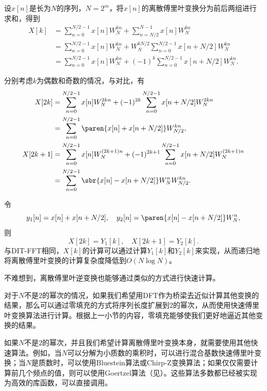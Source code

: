 设$x[n]$是长为$N$的序列，$N=2^m$，将$x[n]$的离散傅里叶变换分为前后两组进行求和，得到
\begin{align}
    X[k]&=\sum_{n=0}^{N/2-1}x[n]W_N^{kn}+\sum_{n=N/2}^{N-1}x[n]W_N^{kn} \nonumber \\
    &=\sum_{n=0}^{N/2-1}x[n]W_N^{kn}+W_N^{kN/2}\sum_{n=0}^{N/2-1}x[n+N/2]W_N^{kn} \nonumber \\
    &=\sum_{n=0}^{N/2-1}x[n]W_N^{kn}+(-1)^k\sum_{n=0}^{N/2-1}x[n+N/2]W_N^{kn}.\label{eq:dif_fft_decomp}
\end{align}

分别考虑$k$为偶数和奇数的情况，与对比，有
\begin{align}
    X[2k]&=\sum_{n=0}^{N/2-1}x[n]W_N^{2kn}+(-1)^{2k}\sum_{n=0}^{N/2-1}x[n+N/2]W_N^{2kn} \nonumber \\
    &=\sum_{n=0}^{N/2-1}\paren{ x[n]+x[n+N/2]}W_{N/2}^{kn},\\
    X[2k+1]&=\sum_{n=0}^{N/2-1}x[n]W_N^{(2k+1)n}+(-1)^{2k+1}\sum_{n=0}^{N/2-1}x[n+N/2]W_N^{(2k+1)n} \nonumber \\
    &=\sum_{n=0}^{N/2-1}\sbr{x[n]-x[n+N/2]}W_{N}^nW_{N/2}^{kn}.
\end{align}

令
\begin{equation}
    y_1[n]= x[n]+x[n+N/2],\quad y_2[n]=\paren{x[n]-x[n+N/2]}W_{N}^n,
\end{equation}
则
\begin{equation}
    X[2k]=Y_1[k],\quad X[2k+1]=Y_2[k].
\end{equation}
与DIT-FFT相同，$X[k]$的计算可以通过计算$Y_1[k]$和$Y_2[k]$来实现，从而递归地将离散傅里叶变换的计算复杂度降低到$O(N\log N)$。

不难想到，离散傅里叶逆变换也能够通过类似的方式进行快速计算。

对于$N$不是$2$的幂次的情况，如果我们希望用DFT作为桥梁去近似计算其他变换的结果，那么可以通过零填充的方式将序列长度扩展到$2$的幂次，从而使用快速傅里叶变换算法进行计算。根据上一小节的内容，零填充能够使我们更好地逼近其他变换的结果。

如果$N$不是$2$的幂次，并且我们希望计算离散傅里叶变换本身，就需要使用其他快速算法。例如，当$N$可以分解为小质数的乘积时，可以进行混合基数快速傅里叶变换；当$N$是质数时，可以使用Bluestein算法或Chirp-Z变换算法；如果仅仅需要计算前几个频点的值，则可以使用Goertzel算法（见\cite{dsp}）。这些算法多数都已经被实现为高效的库函数，可以直接调用。